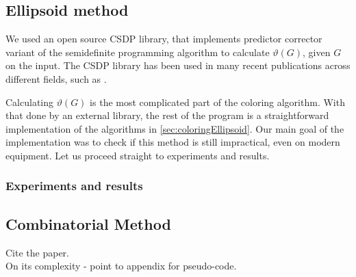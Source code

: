 \subsection{Ellipsoid method}

We used an open source CSDP \cite{csdpRepo, csdp1999} library, that implements predictor corrector variant of the semidefinite programming algorithm to calculate $\vartheta(G)$, given $G$ on the input. The CSDP library has been used in many recent publications across different fields, such as \cite{Ampountolas_2017, Adasme_2011}.

Calculating $\vartheta(G)$ is the most complicated part of the coloring algorithm. With that done by an external library, the rest of the program is a straightforward implementation of the algorithms in \cref{sec:coloringEllipsoid}. Our main goal of the implementation was to check if this method is still impractical, even on modern equipment. Let us proceed straight to experiments and results.

\subsubsection{Experiments and results}

\subsection{Combinatorial Method}

Cite the paper.\\

On its complexity - point to appendix for pseudo-code.